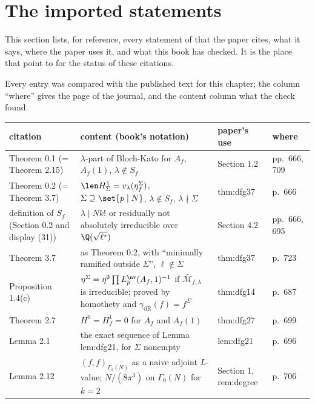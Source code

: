 \section{The imported statements}\label{sec:congruence:imported}

This section lists, for reference, every statement of \cite{DFG04} that the paper cites, what it says, where the paper uses it, and what this book has checked. It is the place that
 point to for the status of these citations.

\begin{remark}\label{rem:congruence:imported-table}
Every entry was compared with the published text \cite{DFG04} for this chapter; the column ``where'' gives the page of the journal, and the content column what the check found.
\begin{center}\small
\begin{tabular}{p{}p{}p{}p{}}
\toprule
citation & content (book's notation) & paper's use & where\\
\midrule
Theorem 0.1 (= Theorem 2.15) & $\lambda$-part of Bloch-Kato for $A_f$, $A_f(1)$, $\lambda\notin S_f$ & Section 1.2 & pp.~666, 709\\
Theorem 0.2 (= Theorem 3.7) & $\len H^1_\Sigma=v_\lambda(\eta^\Sigma_f)$, $\Sigma\supseteq\set{p\mid N}$, $\lambda\notin S_f$, $\lambda\nmid\Sigma$ & thm:dfg37 & p.~666\\
definition of $S_f$ (Section 0.2 and display (31)) & $\lambda\mid Nk!$ or residually not absolutely irreducible over $\Q(\sqrt{\ell^*})$ & Section 4.2 & pp.~666, 695\\
Theorem 3.7 & as Theorem 0.2, with ``minimally ramified outside $\Sigma$'', $\ell\notin\Sigma$ & thm:dfg37 & p.~723\\
Proposition 1.4(c) & $\eta^\Sigma=\eta^\emptyset\prod L^{\nv}_p(A_f,1)^{-1}$ if $\bar{\mathcal M}_{f,\lambda}$ is irreducible; proved by homothety and $\gamma_{\mathrm{dR}}(f)=f^\Sigma$ & thm:dfg14 & p.~687\\
Theorem 2.7 & $H^0=H^1_f=0$ for $A_f$ and $A_f(1)$ & thm:dfg27 & p.~699\\
Lemma 2.1 & the exact sequence of Lemma lem:dfg21, for $\Sigma$ nonempty & lem:dfg21 & p.~696\\
Lemma 2.12 & $(f,f)_{\Gamma_1(N)}$ as a naive adjoint $L$-value; $N/(8\pi^3)$ on $\Gamma_0(N)$ for $k=2$ & Section 1, rem:degree & p.~706\\

\end{tabular}
\end{center}
\end{remark}
